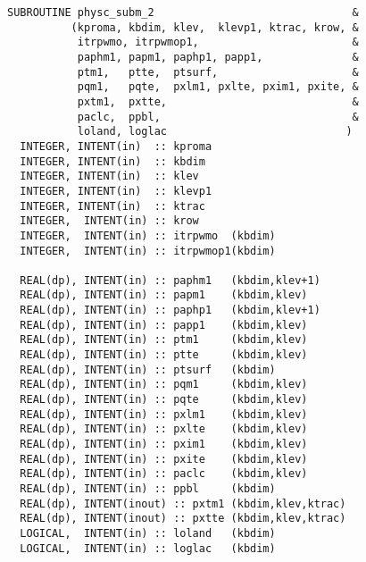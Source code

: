\begin{lstlisting}[caption=physc\_subm\_2]
SUBROUTINE physc_subm_2                               &
          (kproma, kbdim, klev,  klevp1, ktrac, krow, &
           itrpwmo, itrpwmop1,                        &
           paphm1, papm1, paphp1, papp1,              &
           ptm1,   ptte,  ptsurf,                     &
           pqm1,   pqte,  pxlm1, pxlte, pxim1, pxite, &
           pxtm1,  pxtte,                             &
           paclc,  ppbl,                              &
           loland, loglac                            )   
  INTEGER, INTENT(in)  :: kproma                     
  INTEGER, INTENT(in)  :: kbdim                      
  INTEGER, INTENT(in)  :: klev                       
  INTEGER, INTENT(in)  :: klevp1                     
  INTEGER, INTENT(in)  :: ktrac                      
  INTEGER,  INTENT(in) :: krow                       
  INTEGER,  INTENT(in) :: itrpwmo  (kbdim)           
  INTEGER,  INTENT(in) :: itrpwmop1(kbdim)           

  REAL(dp), INTENT(in) :: paphm1   (kbdim,klev+1)    
  REAL(dp), INTENT(in) :: papm1    (kbdim,klev)      
  REAL(dp), INTENT(in) :: paphp1   (kbdim,klev+1)    
  REAL(dp), INTENT(in) :: papp1    (kbdim,klev)      
  REAL(dp), INTENT(in) :: ptm1     (kbdim,klev)      
  REAL(dp), INTENT(in) :: ptte     (kbdim,klev)      
  REAL(dp), INTENT(in) :: ptsurf   (kbdim)           
  REAL(dp), INTENT(in) :: pqm1     (kbdim,klev)      
  REAL(dp), INTENT(in) :: pqte     (kbdim,klev)      
  REAL(dp), INTENT(in) :: pxlm1    (kbdim,klev)      
  REAL(dp), INTENT(in) :: pxlte    (kbdim,klev)      
  REAL(dp), INTENT(in) :: pxim1    (kbdim,klev)      
  REAL(dp), INTENT(in) :: pxite    (kbdim,klev)      
  REAL(dp), INTENT(in) :: paclc    (kbdim,klev)      
  REAL(dp), INTENT(in) :: ppbl     (kbdim)           
  REAL(dp), INTENT(inout) :: pxtm1 (kbdim,klev,ktrac)
  REAL(dp), INTENT(inout) :: pxtte (kbdim,klev,ktrac)
  LOGICAL,  INTENT(in) :: loland   (kbdim)           
  LOGICAL,  INTENT(in) :: loglac   (kbdim)           
\end{lstlisting}

